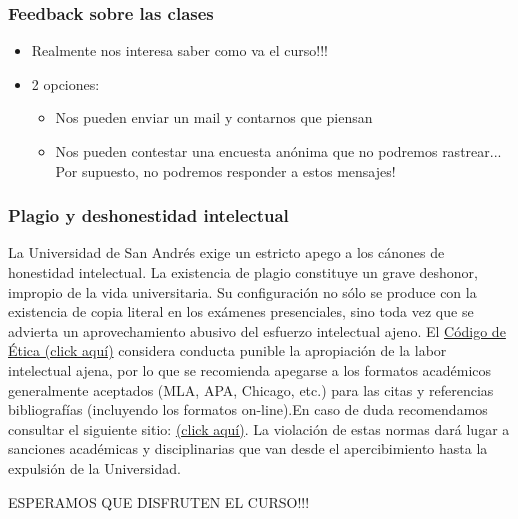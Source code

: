 \documentclass[14pt]{beamer}
\begin{document}
\begin{frame}
\frametitle{Feedback sobre las clases}
\begin{itemize}
    \item Realmente nos interesa saber como va el curso!!! \vspace{2mm}
    \item 2 opciones: \vspace{2mm}
        \begin{itemize}
            \item Nos pueden enviar un mail y contarnos que piensan 
            \item Nos pueden contestar una encuesta anónima que no podremos rastrear... Por supuesto, no podremos responder a estos mensajes!
  
        \end{itemize}
\end{itemize}
\end{frame}

\begin{frame}
\frametitle{Plagio y deshonestidad intelectual}
\small{La Universidad de San Andrés exige un estricto apego a los cánones de honestidad intelectual. La existencia de plagio constituye un grave deshonor, impropio de la vida universitaria. Su configuración no sólo se produce con la existencia de copia literal en los exámenes presenciales, sino toda vez que se advierta un aprovechamiento abusivo del esfuerzo intelectual ajeno. El \href{http://www.udesa.edu.ar/files/Institucional/Politicas_y_Procedimientos_Universidad_de_San_Andres.pdf}{Código de Ética (click aquí)} considera conducta punible la apropiación de la labor intelectual ajena, por lo que se recomienda apegarse a los formatos académicos generalmente aceptados (MLA, APA, Chicago, etc.) para las citas y referencias bibliografías (incluyendo los formatos on-line).En caso de duda recomendamos consultar el siguiente sitio: \href{http://www.udesa.edu.ar/Unidades-Academicas/departamentos-y-escuelas/Humanidades/Prevencion-del-plagio/Que-es-el-plagio.}{(click aquí)}. La violación de estas normas dará lugar a sanciones académicas y disciplinarias que van desde el apercibimiento hasta la expulsión de la Universidad.}
\end{frame}


\begin{frame}
\centering
\huge
ESPERAMOS QUE DISFRUTEN EL CURSO!!!
\end{frame}
\end{document}
